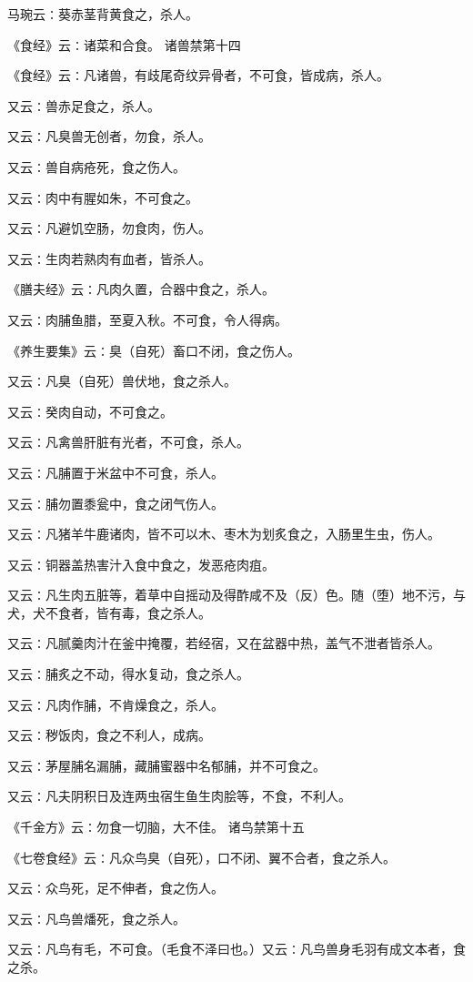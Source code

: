 \documentclass[a4paper,12pt,UTF8,twoside]{ctexbook}
\begin{document}
马琬云∶葵赤茎背黄食之，杀人。

《食经》云∶诸菜和合食。
诸兽禁第十四

《食经》云∶凡诸兽，有歧尾奇纹异骨者，不可食，皆成病，杀人。

又云∶兽赤足食之，杀人。

又云∶凡臭兽无创者，勿食，杀人。

又云∶兽自病疮死，食之伤人。

又云∶肉中有腥如朱，不可食之。

又云∶凡避饥空肠，勿食肉，伤人。

又云∶生肉若熟肉有血者，皆杀人。

《膳夫经》云∶凡肉久置，合器中食之，杀人。

又云∶肉脯鱼腊，至夏入秋。不可食，令人得病。

《养生要集》云∶臭（自死）畜口不闭，食之伤人。

又云∶凡臭（自死）兽伏地，食之杀人。

又云∶癸肉自动，不可食之。

又云∶凡禽兽肝脏有光者，不可食，杀人。

又云∶凡脯置于米盆中不可食，杀人。

又云∶脯勿置黍瓮中，食之闭气伤人。

又云∶凡猪羊牛鹿诸肉，皆不可以木、枣木为划炙食之，入肠里生虫，伤人。

又云∶铜器盖热害汁入食中食之，发恶疮肉疽。

又云∶凡生肉五脏等，着草中自摇动及得酢咸不及（反）色。随（堕）地不污，与犬，犬不食者，皆有毒，食之杀人。

又云∶凡腻羹肉汁在釜中掩覆，若经宿，又在盆器中热，盖气不泄者皆杀人。

又云∶脯炙之不动，得水复动，食之杀人。

又云∶凡肉作脯，不肯燥食之，杀人。

又云∶秽饭肉，食之不利人，成病。

又云∶茅屋脯名漏脯，藏脯蜜器中名郁脯，并不可食之。

又云∶凡夫阴积日及连两虫宿生鱼生肉脍等，不食，不利人。

《千金方》云∶勿食一切脑，大不佳。
诸鸟禁第十五

《七卷食经》云∶凡众鸟臭（自死），口不闭、翼不合者，食之杀人。

又云∶众鸟死，足不伸者，食之伤人。

又云∶凡鸟兽燔死，食之杀人。

又云∶凡鸟有毛，不可食。（毛食不泽曰也。）又云∶凡鸟兽身毛羽有成文本者，食之杀。
\end{document}
